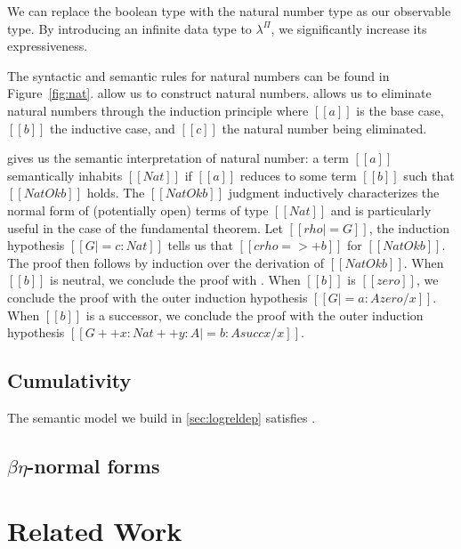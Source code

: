 \documentclass[\ifpublic nolinenum\else\fi,online,OA]{jfp}
\newcommand{\scw}[1]{}
\newcommand{\yl}[1]{}
\newcommand{\lang}{$\lambda^{\Pi}$\xspace}
\theoremstyle{definition}
\begin{document}
We can replace the boolean type with the natural number type as our
observable type. By introducing an infinite data type to \lang,
we significantly increase its expressiveness.

The syntactic and semantic rules for natural numbers can be found in
Figure~\ref{fig:nat}.  allow us to construct natural
numbers.  allows us to eliminate natural numbers
through the induction principle where $[[a]]$ is the base case,
$[[b]]$ the inductive case, and $[[c]]$ the natural number being
eliminated.

 gives us the semantic interpretation of natural number:
a term $[[a]]$ semantically inhabits $[[Nat]]$ if $[[a]]$ reduces to
some term $[[b]]$ such that $[[NatOk b]]$ holds.
The $[[NatOk b]]$ judgment inductively characterizes the
normal form of (potentially open) terms of type $[[Nat]]$ and is
particularly useful in the  case of the fundamental
theorem. Let $[[rho |= G]]$, the induction hypothesis $[[G |= c :
Nat]]$ tells us that $[[c { rho } =>+ b ]]$ for $[[NatOk b]]$. The proof
then follows by induction over the derivation of $[[NatOk b]]$. When
$[[b]]$ is neutral, we conclude the proof with
. When $[[b]]$ is $[[zero]]$, we conclude the
proof with the outer induction hypothesis $[[G |= a : A {zero / x}]]$.
When $[[b]]$ is a successor, we conclude the proof with the outer
induction hypothesis $[[G ++ x : Nat ++ y : A |= b : A { succ x / x
}]]$.

\subsection{Cumulativity}
\label{sec:cumulativity}
The semantic model we build in \cref{sec:logreldep} satisfies
.

\subsection{\texorpdfstring{$\beta\eta$}{beta-eta}-normal forms}

\section{Related Work}
\label{sec:relatedwork}

\end{document}

